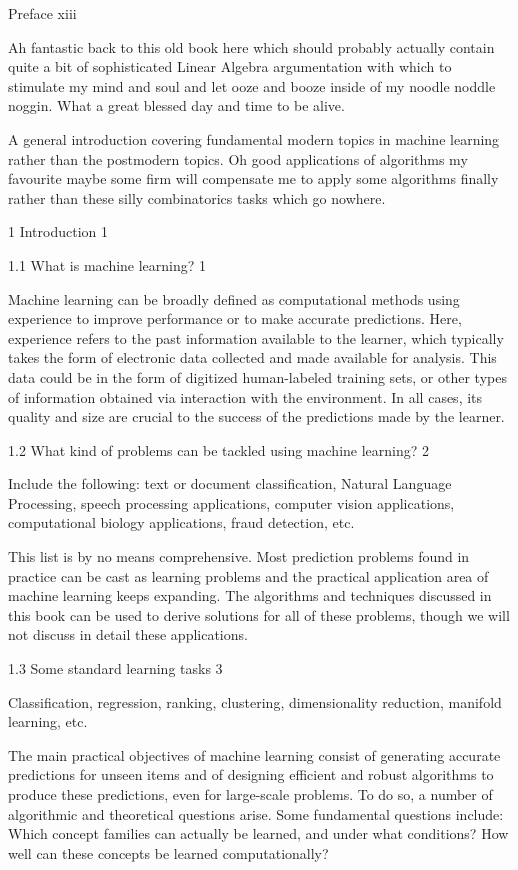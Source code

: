 Preface xiii

Ah fantastic back to this old book here which should probably actually contain quite a bit of sophisticated Linear Algebra argumentation with which to stimulate my mind and soul and let ooze and booze inside of my noodle noddle noggin. What a great blessed day and time to be alive.

A general introduction covering fundamental modern topics in machine learning rather than the postmodern topics. Oh good applications of algorithms my favourite maybe some firm will compensate me to apply some algorithms finally rather than these silly combinatorics tasks which go nowhere.

1 Introduction 1



1.1 What is machine learning? 1

Machine learning can be broadly defined as computational methods using experience to improve performance or to make accurate predictions. Here, experience refers to the past information available to the learner, which typically takes the form of electronic data collected and made available for analysis. This data could be in the form of digitized human-labeled training sets, or other types of information obtained via interaction with the environment. In all cases, its quality and size are crucial to the success of the predictions made by the learner.

1.2 What kind of problems can be tackled using machine learning? 2

Include the following: text or document classification, Natural Language Processing, speech processing applications, computer vision applications, computational biology applications, fraud detection, etc.

This list is by no means comprehensive. Most prediction problems found in practice can be cast as learning problems and the practical application area of machine learning keeps expanding. The algorithms and techniques discussed in this book can be used to derive solutions for all of these problems, though we will not discuss in detail these applications.

1.3 Some standard learning tasks 3

Classification, regression, ranking, clustering, dimensionality reduction, manifold learning, etc.

The main practical objectives of machine learning consist of generating accurate predictions for unseen items and of designing efficient and robust algorithms to produce these predictions, even for large-scale problems. To do so, a number of algorithmic and theoretical questions arise. Some fundamental questions include: Which concept families can actually be learned, and under what conditions? How well can these concepts be learned computationally?

